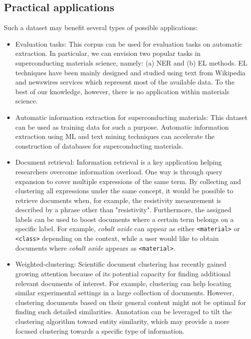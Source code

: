 \documentclass[fleqn,10pt]{wlscirep}
\begin{document}
\subsection*{Practical applications}
Such a dataset may benefit several types of possible applications: 

\begin{itemize}
    \item Evaluation tasks: This corpus can be used for evaluation tasks on automatic extraction. In particular, we can envision two popular tasks in superconducting materials science, namely: (a) NER and (b) EL methods. EL techniques have been mainly designed and studied using text from Wikipedia and newswires services which represent most of the available data. 
    To the best of our knowledge, however, there is no application within materials science.
    \item Automatic information extraction for superconducting materials: This dataset can be used as training data for such a purpose. 
    Automatic information extraction using ML and text mining techniques can accelerate the construction of databases for superconducting materials.
    \item Document retrieval: Information retrieval is a key application helping researchers overcome information overload.
    One way is through query expansion to cover multiple expressions of the same term. 
    By collecting and clustering all expressions under the same concept, it would be possible to retrieve documents when, for example, the resistivity measurement is described by a phrase other than "resistivity". 
    Furthermore, the assigned labels can be used to boost documents where a certain term belongs on a specific label. 
    For example, \textit{cobalt oxide} can appear as either \texttt{<material>} or \texttt{<class>} depending on the context, while a user would like to obtain documents where \textit{cobalt oxide} appears as \texttt{<material>}.
    \item Weighted-clustering: Scientific document clustering has recently gained growing attention because of its potential capacity for finding additional relevant documents of interest.
    For example, clustering can help locating similar experimental settings in a large collection of documents. However, clustering documents based on their general content might not be optimal for finding such detailed similarities.
    Annotation can be leveraged to tilt the clustering algorithm toward entity similarity, which may provide a more focused clustering towards a specific type of information.
\end{itemize}
\end{document}
